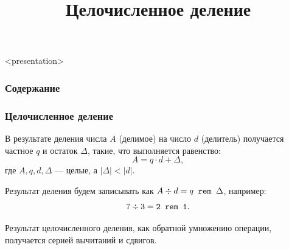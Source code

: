 


\title[Целочисленное деление]{Целочисленное деление}

\setcounter{TaskSimpleCtr}{1}
\newcommand{\TaskSimpleNumber}{ \arabic{TaskSimpleCtr}) \addtocounter{TaskSimpleCtr}{1} }




\begin{frame}<presentation>
    \frametitle{Содержание}
    \tableofcontents
\end{frame}


\begin{frame}
    \frametitle{Целочисленное деление}
    
    В результате деления числа $A$ (делимое) на число $d$ (делитель) получается частное $q$ и остаток $\Delta$, такие, что выполняется равенство:
    \[
        A = q \cdot d + \Delta,
    \]
    где $A, q, d, \Delta$ --- целые, а $|\Delta|<|d|$.

    Результат деления будем записывать как $A\div d=q \texttt{ rem } \Delta$, например:
    \[
        7\div 3=\texttt{2 rem 1}.
    \]
    
    \begin{block}{}
        Результат целочисленного деления, как обратной умножению операции, получается серией вычитаний и сдвигов.
    \end{block}
\end{frame}


